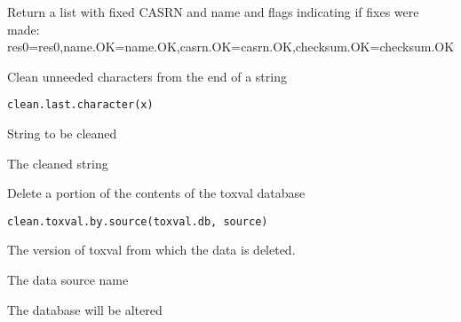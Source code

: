 \documentclass[letterpaper]{book}
\begin{document}
%
\begin{Value}
Return a list with fixed CASRN and name and flags indicating if fixes were made:
res0=res0,name.OK=name.OK,casrn.OK=casrn.OK,checksum.OK=checksum.OK
\end{Value}
%
\begin{Description}\relax
Clean unneeded characters from the end of a string
\end{Description}
%
\begin{Usage}
\begin{verbatim}
clean.last.character(x)
\end{verbatim}
\end{Usage}
%
\begin{Arguments}
\begin{ldescription}
\item[\code{x}] String to be cleaned
\end{ldescription}
\end{Arguments}
%
\begin{Value}
The cleaned string
\end{Value}
%
\begin{Description}\relax
Delete a portion of the contents of the toxval database
\end{Description}
%
\begin{Usage}
\begin{verbatim}
clean.toxval.by.source(toxval.db, source)
\end{verbatim}
\end{Usage}
%
\begin{Arguments}
\begin{ldescription}
\item[\code{toxval.db}] The version of toxval from which the data is deleted.

\item[\code{source}] The data source name
\end{ldescription}
\end{Arguments}
%
\begin{Value}
The database will be altered
\end{Value}
\end{document}
